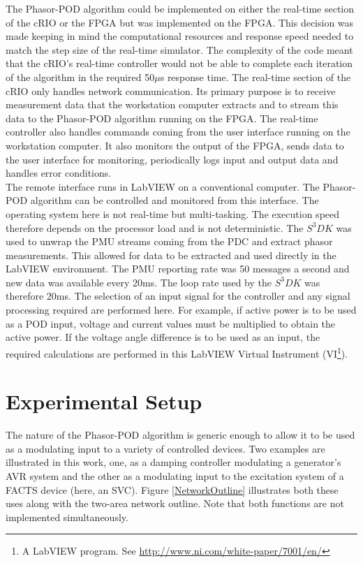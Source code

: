 \documentclass{ieeeaccess}
\begin{document}
The Phasor-POD algorithm could be implemented on either the real-time section of the cRIO or the FPGA but was implemented on the FPGA. This decision was made keeping in mind the computational resources and response speed needed to match the step size of the real-time simulator. The complexity of the code meant that the cRIO\rq{s} real-time controller would not be able to complete each iteration of the algorithm in the required 50$\mu$s response time. The real-time section of the cRIO only handles network communication. Its primary purpose is to receive measurement data that the workstation computer extracts and to stream this data to the Phasor-POD algorithm running on the FPGA. The real-time controller also handles commands coming from the user interface running on the workstation computer.  It also monitors the output of the FPGA, sends data to the user interface for monitoring, periodically logs input and output data and handles error conditions.\\

The remote interface runs in LabVIEW on a conventional computer. The Phasor-POD algorithm can be controlled and monitored from this interface. The operating system here is not real-time but multi-tasking. The execution speed therefore depends on the processor load and is not deterministic. The  $S^{3}DK$ was used to unwrap the PMU streams coming from the PDC and extract phasor measurements. This allowed for data to be extracted and used directly in the LabVIEW environment. The PMU reporting rate was 50 messages a second and new data was available every 20ms. The loop rate used by the $S^{3}DK$ was therefore 20ms. The selection of an input signal for the controller and any signal processing required are performed here. For example, if active power is to be used as a POD input, voltage and current values must be multiplied to obtain the active power. If the voltage angle difference is to be used as an input, the required calculations are performed in this LabVIEW Virtual Instrument (VI\footnote{A LabVIEW program. See \underline{http://www.ni.com/white-paper/7001/en/}}).

\section{Experimental Setup}\label{SetupPreparation}

The nature of the Phasor-POD algorithm is generic enough to allow it to be used as a modulating input to a variety of controlled devices. Two examples are illustrated in this work, one, as a damping controller modulating a generator\rq{s} AVR system and the other as a modulating input to the excitation system of a FACTS device (here, an SVC). Figure \ref{NetworkOutline} illustrates both these uses along with the two-area network outline. Note that both functions are not implemented simultaneously.
\end{document}

